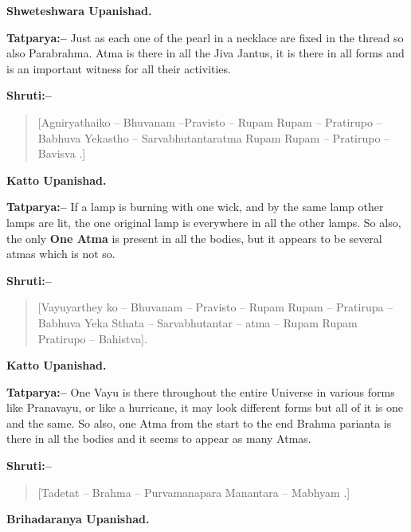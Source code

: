 \begin{flushright}
\textbf{Shweteshwara Upanishad.}
\end{flushright}

\textbf{Tatparya:–} Just as each one of the pearl in a necklace are fixed in the thread so also Parabrahma. Atma is there in all the Jiva Jantus, it is there in all forms and is an important witness for all their activities.

\textbf{Shruti:–}

\begin{verse}
[Agniryathaiko – Bhuvanam –Pravisto – Rupam Rupam – Pratirupo – Babhuva  Yekastho – Sarvabhutantaratma Rupam Rupam – Pratirupo – Bavisva .]
\end{verse}

\begin{flushright}
\textbf{Katto Upanishad.}
\end{flushright}

\textbf{Tatparya:–} If a lamp is burning with one wick, and by the same lamp other lamps are lit, the one original lamp is everywhere in all the other lamps. So also, the only \textbf{One Atma} is present in all the bodies, but it appears to be several atmas which is not so.

\textbf{Shruti:–}

\begin{verse}
[Vayuyarthey ko – Bhuvanam – Pravisto – Rupam Rupam – Pratirupa – Babhuva  Yeka Sthata – Sarvabhutantar – atma – Rupam Rupam Pratirupo – Bahistva].
\end{verse}

\begin{flushright}
\textbf{Katto Upanishad.}
\end{flushright}

\textbf{Tatparya:–} One Vayu is there throughout the entire Universe in various forms like Pranavayu, or like a hurricane, it may look different forms but all of it is one and the same. So also, one Atma from the start to the end Brahma parianta is there in all the bodies and it seems to appear as many Atmas.

\textbf{Shruti:–}

\begin{verse}
[Tadetat – Brahma – Purvamanapara Manantara – Mabhyam .]
\end{verse}

\begin{flushright}
\textbf{Brihadaranya Upanishad.}
\end{flushright}

